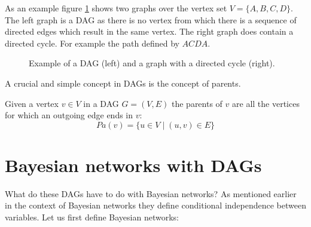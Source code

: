 \noindent
As an example figure \ref{fig:example_DAG} shows two graphs 
over the vertex set $V=\{A, B, C, D\}$. The left graph is a DAG
as there is no vertex from which there is a sequence of directed
edges which result in the same vertex. The right graph does 
contain a directed cycle. For example the path defined by $ACDA$.

\begin{figure}[h!]
\centering

\begin{minipage}[c]{0.3\textwidth}
\end{minipage}
\begin{minipage}[c]{0.3\textwidth}
\end{minipage}
\caption{Example of a DAG (left) and a graph with a directed
cycle (right).}
\label{fig:example_DAG}
\end{figure}

\noindent
A crucial and simple concept in DAGs is the concept of parents.
\begin{defn}
Given a vertex $v \in V$ in a DAG $G=(V, E)$ the parents of 
$v$ are all the vertices for which an outgoing edge ends in $v$:
\begin{equation}
Pa(v) = \{ u \in V \mid (u, v) \in E\}
\end{equation}
\end{defn}

\section{Bayesian networks with DAGs}
What do these DAGs have to do with Bayesian networks? As mentioned
earlier in the context of Bayesian networks they define conditional
independence between variables. Let us first define Bayesian networks:

